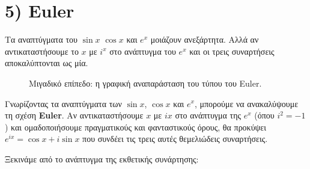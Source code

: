\documentclass[a4paper, 11pt]{article}
\begin{document}
\section{5) Euler}\label{euler}

Τα αναπτύγματα του \(\sin x\) \(\cos x\) και \(e^x\) μοιάζουν
ανεξάρτητα. Αλλά αν αντικαταστήσουμε το \(x\) με \(i^x\) στο ανάπτυγμα
του \(e^x\) και οι τρεις συναρτήσεις αποκαλύπτονται ως μία.

\begin{figure}[htbp]
\centering
{}
\caption{Μιγαδικό επίπεδο: η γραφική αναπαράσταση του τύπου του Euler.}
\label{fig:euler}
\par   %
\end{figure}

Γνωρίζοντας τα αναπτύγματα των \(\sin x\), \(\cos x\) και \(e^x\),
μπορούμε να ανακαλύψουμε τη σχέση \textbf{Euler}. Αν αντικαταστήσουμε
\(x\) με \(ix\) στο ανάπτυγμα της \(e^x\) (όπου \(i^2=-1\)) και
ομαδοποιήσουμε πραγματικούς και φανταστικούς όρους, θα προκύψει
\(e^{ix} = \cos x + i\sin x\) που συνδέει τις τρεις αυτές θεμελιώδεις
συναρτήσεις.

Ξεκινάμε από το ανάπτυγμα της εκθετικής συνάρτησης:
\end{document}
